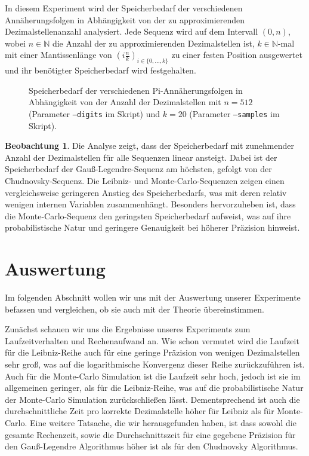 \documentclass{scrartcl}
\theoremstyle{definition}
\newtheorem{approximation sequence}{Annäherungsfolge}
\newtheorem{observation}{Beobachtung}
\begin{document}
In diesem Experiment wird der Speicherbedarf der verschiedenen
Annäherungsfolgen in Abhängigkeit von der zu approximierenden
Dezimalstellenanzahl analysiert. Jede Sequenz wird auf dem Intervall \((0,
n)\), wobei \(n \in \mathbb{N}\) die Anzahl der zu approximierenden
Dezimalstellen ist, \(k \in \mathbb{N}\)-mal mit einer Mantissenlänge von
\(\left(i \frac{n}{k}\right)_{i \in \{0, \ldots, k\}}\) zu einer festen
Position ausgewertet und ihr benötigter Speicherbedarf wird festgehalten.

\begin{figure}[H]
    \centering
    
    \caption{
        Speicherbedarf der verschiedenen Pi-Annäherungsfolgen in Abhängigkeit
        von der Anzahl der Dezimalstellen mit \(n = 512\) (Parameter
        \texttt{--digits} im Skript) und \(k = 20\) (Parameter
        \texttt{--samples} im Skript).
    }
    \label{fig:memory-usage}
\end{figure}

\begin{observation}
    Die Analyse zeigt, dass der Speicherbedarf mit zunehmender Anzahl der
    Dezimalstellen für alle Sequenzen linear ansteigt. Dabei ist der
    Speicherbedarf der Gauß-Legendre-Sequenz am höchsten, gefolgt von der
    Chudnovsky-Sequenz. Die Leibniz- und Monte-Carlo-Sequenzen zeigen einen
    vergleichsweise geringeren Anstieg des Speicherbedarfs, was mit deren
    relativ wenigen internen Variablen zusammenhängt. Besonders hervorzuheben
    ist, dass die Monte-Carlo-Sequenz den geringsten Speicherbedarf aufweist,
    was auf ihre probabilistische Natur und geringere Genauigkeit bei höherer
    Präzision hinweist.
\end{observation}

\section{Auswertung}
Im folgenden Abschnitt wollen wir uns mit der Auswertung unserer Experimente
befassen und vergleichen, ob sie auch mit der Theorie übereinstimmen.

Zunächst schauen wir uns die Ergebnisse unseres Experiments zum
Laufzeitverhalten und Rechenaufwand an. Wie schon vermutet wird die Laufzeit
für die Leibniz-Reihe auch für eine geringe Präzision von wenigen
Dezimalstellen sehr groß, was auf die logarithmische Konvergenz dieser Reihe
zurückzuführen ist. Auch für die Monte-Carlo Simulation ist die Laufzeit sehr
hoch, jedoch ist sie im allgemeinen geringer, als für die Leibniz-Reihe, was
auf die probabilistische Natur der Monte-Carlo Simulation zurückschließen
lässt. Dementsprechend ist auch die durchschnittliche Zeit pro korrekte
Dezimalstelle höher für Leibniz als für Monte-Carlo. Eine weitere Tatsache, 
die wir herausgefunden haben, ist dass sowohl die gesamte Rechenzeit, sowie 
die Durchschnittszeit für eine gegebene Präzision für den Gauß-Legendre 
Algorithmus höher ist als für den Chudnovsky Algorithmus.
\end{document}
